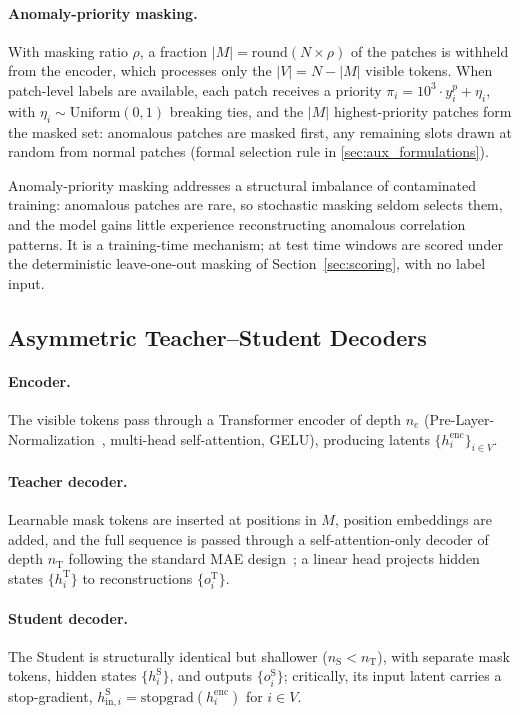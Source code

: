 \paragraph{Anomaly-priority masking.}
With masking ratio $\rho$, a fraction $|M| = \mathrm{round}(N \times \rho)$ of the patches is
withheld from the encoder, which processes only the $|V| = N - |M|$ visible tokens.
When patch-level labels are available, each patch receives a priority
$\pi_i = 10^3 \cdot y^p_i + \eta_i$, with $\eta_i \sim \mathrm{Uniform}(0,1)$ breaking ties,
and the $|M|$ highest-priority patches form the masked set: anomalous patches are masked first,
any remaining slots drawn at random from normal patches (formal selection rule in
\ref{sec:aux_formulations}).

Anomaly-priority masking addresses a structural imbalance of contaminated training: anomalous
patches are rare, so stochastic masking seldom selects them, and the model gains little
experience reconstructing anomalous correlation patterns.
It is a training-time mechanism; at test time windows are scored under the deterministic
leave-one-out masking of Section~\ref{sec:scoring}, with no label input.

\subsection{Asymmetric Teacher--Student Decoders}
\label{sec:decoders}

\paragraph{Encoder.}
The visible tokens pass through a Transformer encoder of depth $n_e$ (Pre-Layer-Normalization~\cite{xiong2020prenorm}, multi-head self-attention, GELU), producing latents $\{h^{\mathrm{enc}}_i\}_{i \in V}$.

\paragraph{Teacher decoder.}
Learnable mask tokens are inserted at positions in $M$, position embeddings are added, and the
full sequence is passed through a self-attention-only decoder of depth $n_{\mathrm{T}}$ following
the standard MAE design~\cite{he2022mae}; a linear head projects hidden states
$\{h^{\mathrm{T}}_i\}$ to reconstructions $\{o^{\mathrm{T}}_i\}$.

\paragraph{Student decoder.}
The Student is structurally identical but shallower ($n_{\mathrm{S}} < n_{\mathrm{T}}$), with
separate mask tokens, hidden states $\{h^{\mathrm{S}}_i\}$, and outputs $\{o^{\mathrm{S}}_i\}$;
critically, its input latent carries a stop-gradient,
$h^{\mathrm{S}}_{\mathrm{in},i} = \mathrm{stopgrad}(h^{\mathrm{enc}}_i)$ for $i \in V$.

